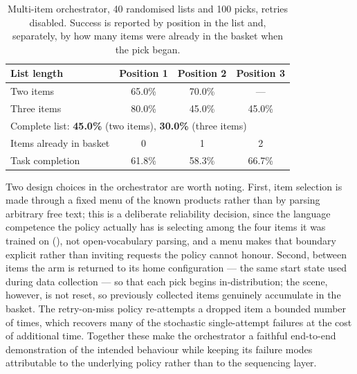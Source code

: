 \begin{table}[ht]
\caption{Multi-item orchestrator, 40 randomised lists and 100 picks, retries disabled.
Success is reported by position in the list and, separately, by how many items were
already in the basket when the pick began.}
\begin{center}
\begin{tabular}{lccc}
\toprule
List length & Position 1 & Position 2 & Position 3 \\
\midrule
Two items   & 65.0\% & 70.0\% & --- \\
Three items & 80.0\% & 45.0\% & 45.0\% \\
\midrule
\multicolumn{4}{l}{Complete list: \textbf{45.0\%} (two items), \textbf{30.0\%} (three items)} \\
\midrule
Items already in basket & 0 & 1 & 2 \\
Task completion & 61.8\% & 58.3\% & 66.7\% \\
\bottomrule
\end{tabular}
\end{center}
\label{tab:multiitem}
\end{table}

Two design choices in the orchestrator are worth noting. First, item selection is
made through a fixed menu of the known products rather than by parsing arbitrary free
text; this is a deliberate reliability decision, since the language competence the
policy actually has is selecting among the four items it was trained on
(), not open-vocabulary parsing, and a menu makes that
boundary explicit rather than inviting requests the policy cannot honour. Second, between items the arm is returned to its home
configuration --- the same start state used during data collection --- so that each
pick begins in-distribution; the scene, however, is not reset, so previously collected
items genuinely accumulate in the basket. The retry-on-miss policy re-attempts a
dropped item a bounded number of times, which recovers many of the stochastic
single-attempt failures at the cost of additional time. Together these make the
orchestrator a faithful end-to-end demonstration of the intended behaviour while
keeping its failure modes attributable to the underlying policy rather than to the
sequencing layer.

